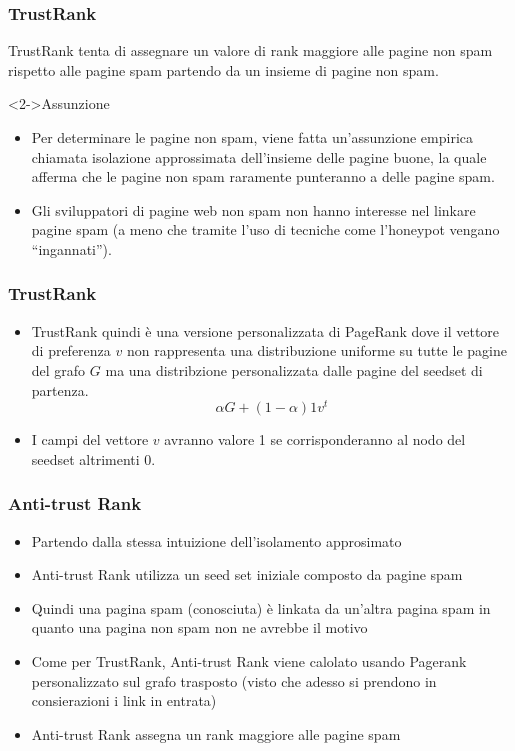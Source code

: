 \documentclass{beamer}
\begin{document}
\begin{frame}
  \frametitle{TrustRank}
  TrustRank tenta di assegnare un valore di rank maggiore alle pagine non spam rispetto alle pagine spam partendo da un insieme di pagine non spam.
  \begin{block}<2->{Assunzione}
  \begin{itemize}
   \item Per determinare le pagine non spam, viene fatta un’assunzione empirica chiamata isolazione approssimata dell’insieme delle pagine buone, la quale afferma che le pagine non spam raramente punteranno a delle pagine spam.
   \item Gli sviluppatori di pagine web non spam non hanno interesse nel linkare pagine spam (a meno che tramite l’uso di tecniche come l’honeypot vengano “ingannati”).
  \end{itemize}
  \end{block}
\end{frame}
\begin{frame}
  \frametitle{TrustRank}
  \begin{itemize}
   \item   TrustRank quindi è una versione personalizzata di PageRank dove il vettore di preferenza \(v\) non rappresenta una distribuzione uniforme su tutte le pagine del grafo \(G\) ma una distribzione personalizzata dalle pagine del seedset di partenza.
$$
   \alpha G + (1-\alpha)1v^t
$$
\item I campi del vettore \(v\) avranno valore 1 se corrisponderanno al nodo del seedset altrimenti 0.
  \end{itemize}
\end{frame}
\begin{frame}
  \frametitle{Anti-trust Rank}
  \begin{itemize}
   \item Partendo dalla stessa intuizione dell'isolamento approsimato 
   \item Anti-trust Rank utilizza un seed set iniziale composto da pagine spam
   \item Quindi una pagina spam (conosciuta) è linkata da un'altra pagina spam in quanto una pagina non spam non ne avrebbe il motivo 
   \item Come per TrustRank, Anti-trust Rank viene calolato usando Pagerank personalizzato sul grafo trasposto (visto che adesso si prendono in consierazioni i link in entrata)
   \item Anti-trust Rank assegna un rank maggiore alle pagine spam
  \end{itemize}
\end{frame}
\end{document}
